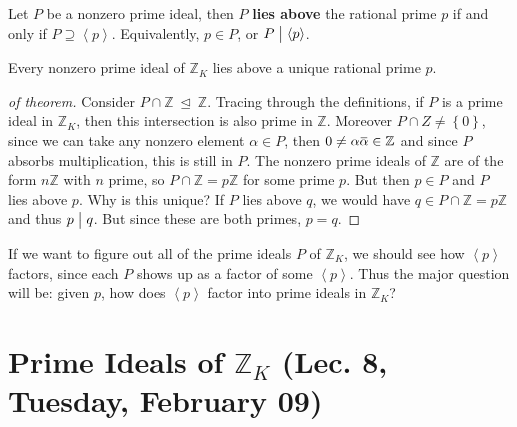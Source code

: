 \begin{definition}

Let \(P\) be a nonzero prime ideal, then \(P\) \textbf{lies above} the
rational prime \(p\) if and only if
\(P \supseteq \left\langle{ p }\right\rangle\). Equivalently,
\(p\in P\), or \(P\bigm|\left\langle{ p }\right\rangle\).

\end{definition}

\begin{theorem}

Every nonzero prime ideal of \({\mathbb{Z}}_K\) lies above a unique
rational prime \(p\).

\end{theorem}

\begin{proof}[of theorem]

Consider \(P \cap{\mathbb{Z}}{~\trianglelefteq~}{\mathbb{Z}}\). Tracing
through the definitions, if \(P\) is a prime ideal in
\({\mathbb{Z}}_K\), then this intersection is also prime in
\({\mathbb{Z}}\). Moreover \(P \cap Z \neq \left\{{ 0 }\right\}\), since
we can take any nonzero element \(\alpha \in P\), then
\(0\neq \alpha\mkern 1.5mu\overline{\mkern-1.5mu\alpha \mkern-1.5mu}\mkern 1.5mu\in {\mathbb{Z}}\)
and since \(P\) absorbs multiplication, this is still in \(P\). The
nonzero prime ideals of \({\mathbb{Z}}\) are of the form
\(n{\mathbb{Z}}\) with \(n\) prime, so
\(P \cap{\mathbb{Z}}= p{\mathbb{Z}}\) for some prime \(p\). But then
\(p\in P\) and \(P\) lies above \(p\). Why is this unique? If \(P\) lies
above \(q\), we would have \(q\in P \cap{\mathbb{Z}}= p {\mathbb{Z}}\)
and thus \(p\bigm|q\). But since these are both primes, \(p=q\).

\end{proof}

\begin{remark}

If we want to figure out all of the prime ideals \(P\) of
\({\mathbb{Z}}_K\), we should see how \(\left\langle{ p }\right\rangle\)
factors, since each \(P\) shows up as a factor of some
\(\left\langle{ p }\right\rangle\). Thus the major question will be:
given \(p\), how does \(\left\langle{ p }\right\rangle\) factor into
prime ideals in \({\mathbb{Z}}_K\)?

\end{remark}

\hypertarget{prime-ideals-of-mathbbz_k-lec.-8-tuesday-february-09}{%
\section{\texorpdfstring{Prime Ideals of \({\mathbb{Z}}_K\) (Lec. 8,
Tuesday, February
09)}{Prime Ideals of \{\textbackslash mathbb\{Z\}\}\_K (Lec. 8, Tuesday, February 09)}}\label{prime-ideals-of-mathbbz_k-lec.-8-tuesday-february-09}}

